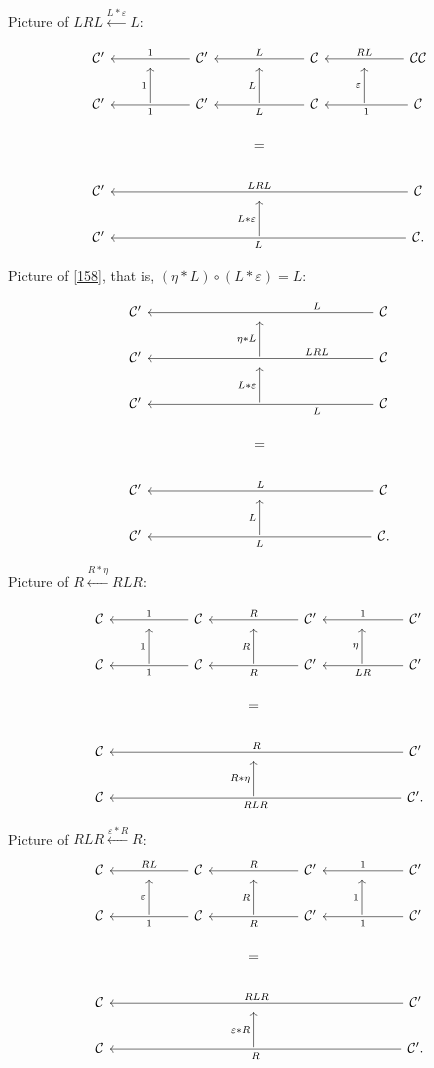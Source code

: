 \documentclass[12pt]{article}
\theoremstyle{remark}
\theoremstyle{definition}
\newcommand{\C}{\mathcal C}
\newcommand{\ee}{\varepsilon}
\begin{document}
Picture of $LRL\xleftarrow{L*\ee}L$:
 
$$
\begin{tikzcd}
%
\C'&{}&\C'\ar{ll}{}[swap]{1}&{}&\C\ar{ll}{}[swap]{L}&{}&\C\C\ar{ll}{}[swap]{RL}\\ 
%
\C'&\ar{u}{1}&\C'\ar{ll}{}{1}&\ar{u}{L}&\C\ar{ll}{}{L}&\ar{u}{\ee}&\C\ar{ll}{}{1}\\ 
%
&&&=\\ 
%
\C'&&&{}&&&\C\ar{llllll}[swap]{LRL}\\
%
\C'&&&\ar{u}{L*\ee}&&&\C\ar{llllll}{L}.
%
\end{tikzcd}
$$ 

Picture of \eqref{158}, that is, $(\eta*L)\circ(L*\ee)=L$:

$$
\begin{tikzcd}
%
\C'&&&{}&&&\C\ar{llllll}[near start,swap]{L}\\
%
\C'&&&\ar{u}{\eta*L}&&&\C\ar{llllll}[near start,swap]{LRL}\\
%
\C'&&&\ar{u}{L*\ee}&&&\C\ar{llllll}[near start]{L}\\ 
%
&&&=\\ 
%
\C'&&&{}&&&\C\ar{llllll}[swap]{L}\\ 
%
\C'&&&\ar{u}{L}&&&\C.\ar{llllll}{L}
%
\end{tikzcd}
$$ 

Picture of $R\xleftarrow{R*\eta}RLR$:
 
$$
\begin{tikzcd}
%
\C&{}&\C\ar{ll}{}[swap]{1}&{}&\C'\ar{ll}{}[swap]{R}&{}&\C'\ar{ll}{}[swap]{1}\\ 
%
\C&\ar{u}{1}&\C\ar{ll}{}{1}&\ar{u}{R}&\C'\ar{ll}{}{R}&\ar{u}{\eta}&\C'\ar{ll}{}{LR}\\ 
%
&&&=\\ 
%
\C&&&{}&&&\C'\ar{llllll}[swap]{R}\\
%
\C&&&\ar{u}{R*\eta}&&&\C'\ar{llllll}{RLR}.
%
\end{tikzcd}
$$ 

Picture of $RLR\xleftarrow{\ee*R}R$:
$$
\begin{tikzcd}
%
\C&{}&\C\ar{ll}{}[swap]{RL}&{}&\C'\ar{ll}{}[swap]{R}&{}&\C'\ar{ll}{}[swap]{1}\\ 
%
\C&\ar{u}{\ee}&\C\ar{ll}{}{1}&\ar{u}{R}&\C'\ar{ll}{}{R}&\ar{u}{1}&\C'\ar{ll}{}{1}\\ 
%
&&&=\\ 
%
\C&&&{}&&&\C'\ar{llllll}[swap]{RLR}\\
%
\C&&&\ar{u}{\ee*R}&&&\C'\ar{llllll}{R}.
%
\end{tikzcd}
$$ 
\end{document}

